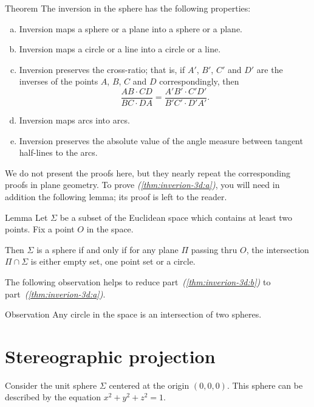 \begin{thm}{Theorem}\label{thm:inverion-3d}
The inversion in the sphere has the following properties:
\begin{enumerate}[(a)]
\item\label{thm:inverion-3d:a} Inversion maps a sphere or a plane into a sphere or a plane.
\item\label{thm:inverion-3d:b} Inversion maps a circle or a line into a circle or a line. 
\item\label{thm:inverion-3d:cross-ratio} Inversion preserves the cross-ratio;
that is, if $A'$, $B'$, $C'$ and $D'$ are the inverses of the points $A$, $B$, $C$ and $D$ correspondingly,
then
$$\frac{AB\cdot CD}{BC\cdot DA}= \frac{A'B'\cdot C'D'}{B'C'\cdot D'A'}.$$
\item Inversion maps arcs into arcs.
\item\label{thm:inverion-3d:angle} Inversion preserves the absolute value of the angle
measure between tangent half-lines to the arcs.
\end{enumerate}
\end{thm}


We do not present the proofs here, but
they nearly repeat the corresponding proofs in plane geometry.
To prove \textit{(\ref{thm:inverion-3d:a})}, you will need in addition the following lemma;
its proof is left to the reader.

\begin{thm}{Lemma}
Let $\Sigma$ be a subset of the Euclidean space
which contains at least two points.
Fix a point $O$ in the space.

Then $\Sigma$ is 
a sphere 
if and only if
for any plane $\Pi$ passing thru $O$,
the intersection $\Pi\cap \Sigma$ is either empty set,
one point set or a circle.
\end{thm}  

The following observation helps to reduce part~\textit{(\ref{thm:inverion-3d:b})} to part~\textit{(\ref{thm:inverion-3d:a})}.

\begin{thm}{Observation}
Any circle in the space is an intersection of two spheres.
\end{thm}


\section*{Stereographic projection}

Consider the unit sphere $\Sigma$ 
centered at the origin $(0,0,0)$.
This sphere can be described by the equation $x^2+y^2+z^2=1$. 

